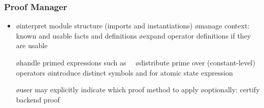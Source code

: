 \begin{frame}
  \frametitle{Proof Manager}

  \begin{itemize}
  \item {}

    \begin{itemize}
    \o interpret module structure (imports and instantiations)
    \o manage context: known and usable facts and definitions
    \o expand operator definitions if they are usable
    \end{itemize}

  \oo {}

    \begin{itemize}
    \o handle primed expressions such as\ \ 
    \o distribute prime over (constant-level) operators
    \o introduce distinct symbols  and 
       for atomic state expression 
    \end{itemize}

  \oo {}

    \begin{itemize}
    \o user may explicitly indicate which proof method to apply
    \o optionally: certify backend proof
    \end{itemize}
  \end{itemize}
\end{frame}

